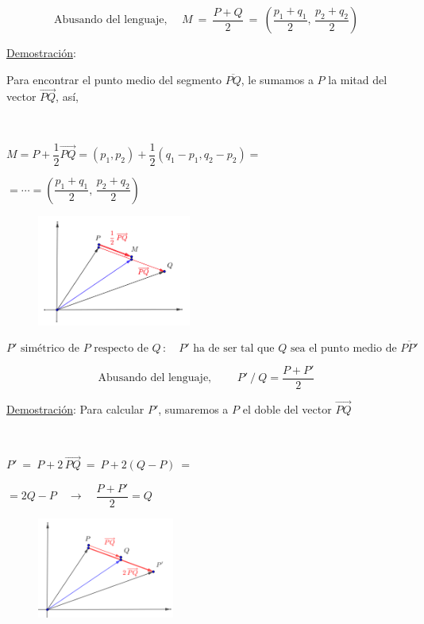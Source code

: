 \begin{theorem}

$$\text{Abusando del lenguaje, \ } \quad M\ = \ \dfrac{P+Q}{2} \ = \ \left( \dfrac{p_1+q_1}{2},\, \dfrac{p_2+q_2}{2} \right) $$
\end{theorem}
\begin{multicols}{2}
\underline{Demostración}:


Para encontrar el punto medio del segmento $\overline{PQ}$, le sumamos a $P$ la mitad del vector $\overrightarrow{PQ}$, así,

$\quad$ 

$M=P+\dfrac 1 2 \overrightarrow{PQ}=(p_1,p_2)+\dfrac 1 2 (q_1-p_1,q_2-p_2)=$

$=\cdots = \left( \dfrac{p_1+q_1}{2},\, \dfrac{p_2+q_2}{2} \right)$ \QED
 \begin{figure}[H]
	\centering
	\includegraphics[width=0.45\textwidth]{img-ga/ga07.png}
\end{figure}
\end{multicols}
\vspace{5mm}

\begin{theorem}

$$P' \text{ simétrico de } P \text{ respecto de } Q\, : \quad P' \text{ ha de ser tal que } Q \text{ sea el punto medio de } \overline{PP'}$$

\vspace{-4mm} $$\text{Abusando del lenguaje, } \qquad  P' \ / \ Q=\dfrac{P+P'}{2} $$
\end{theorem}

\begin{multicols}{2}
\underline{Demostración}:
Para calcular $P'$, sumaremos a $P$ el doble del vector $\overrightarrow{PQ}$

$\quad$ 

\vspace{2mm} $P'\ = \ P+2\,  \overrightarrow{PQ} \ = \ P+2(Q-P) \ = $

\vspace{2mm} $= 2Q-P \quad \to \quad  \dfrac{P+P'}{2}=Q$ \QED
 \begin{figure}[H]
	\centering
	\includegraphics[width=0.4\textwidth]{img-ga/ga08.png}
\end{figure}
\end{multicols}

